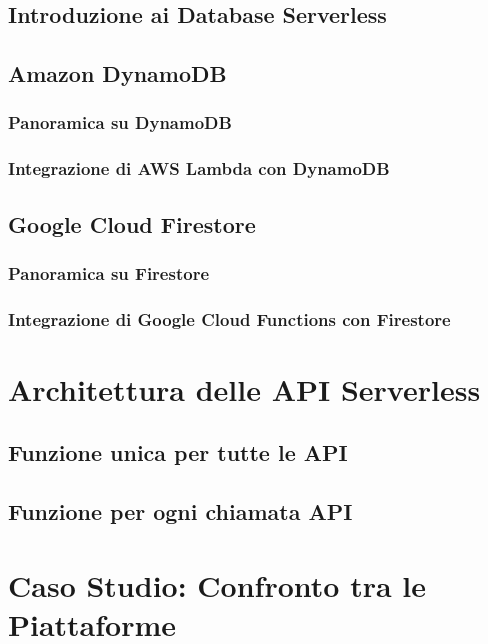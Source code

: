 \documentclass[12pt,a4paper,twoside]{book}
\begin{document}
\section{Introduzione ai Database Serverless}


\section{Amazon DynamoDB}
\subsection{Panoramica su DynamoDB}


\subsection{Integrazione di AWS Lambda con DynamoDB}


\section{Google Cloud Firestore}
\subsection{Panoramica su Firestore}


\subsection{Integrazione di Google Cloud Functions con Firestore}


\chapter{Architettura delle API Serverless}


\section{Funzione unica per tutte le API}


\section{Funzione per ogni chiamata API}


\chapter{Caso Studio: Confronto tra le Piattaforme}

\end{document}

